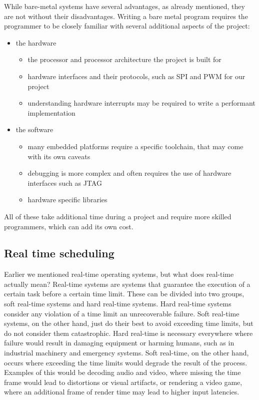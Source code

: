 While bare-metal systems have several advantages, as already mentioned, they are not without their disadvantages.
Writing a bare metal program requires the programmer to be closely familiar with several additional aspects of the project:
\begin{itemize}
    \item the hardware
    \begin{itemize}
        \item the processor and processor architecture the project is built for
        \item hardware interfaces and their protocols, such as SPI and PWM for our project
        \item understanding hardware interrupts may be required to write a performant implementation
    \end{itemize}
    \item the software
    \begin{itemize}
        \item many embedded platforms require a specific toolchain, that may come with its own caveats
        \item debugging is more complex and often requires the use of hardware interfaces such as JTAG
        \item hardware specific libraries
    \end{itemize}
\end{itemize}
All of these take additional time during a project and require more skilled programmers, which can add its own cost.

\subsection{Real time scheduling}
\label{sec:background:bm_vs_os:rtos}

Earlier we mentioned real-time operating systems, but what does real-time actually mean?
Real-time systems are systems that guarantee the execution of a certain task before a certain time limit.
These can be divided into two groups, soft real-time systems and hard real-time systems.
Hard real-time systems consider any violation of a time limit an unrecoverable failure.
Soft real-time systems, on the other hand, just do their best to avoid exceeding time limits, but do not consider them catastrophic.
Hard real-time is necessary everywhere where failure would result in damaging equipment or harming humans, such as in industrial machinery and emergency systems.
Soft real-time, on the other hand, occurs where exceeding the time limits would degrade the result of the process.
Examples of this would be decoding audio and video, where missing the time frame would lead to distortions or visual artifacts,
or rendering a video game, where an additional frame of render time may lead to higher input latencies.

